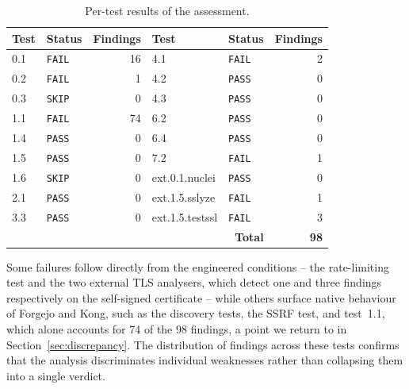 \begin{table}
  \caption{Per-test results of the assessment.}
  \label{tab:results}
  \begin{tabular}{llr @{\hspace{1em}} | @{\hspace{1em}} llr}
    \toprule
    \textbf{Test}                      & \textbf{Status} & \textbf{Findings} & \textbf{Test}   & \textbf{Status} & \textbf{Findings} \\
    \midrule
    0.1                                & \texttt{FAIL}   & 16                & 4.1             & \texttt{FAIL}   & 2                 \\
    0.2                                & \texttt{FAIL}   & 1                 & 4.2             & \texttt{PASS}   & 0                 \\
    0.3                                & \texttt{SKIP}   & 0                 & 4.3             & \texttt{PASS}   & 0                 \\
    1.1                                & \texttt{FAIL}   & 74                & 6.2             & \texttt{PASS}   & 0                 \\
    1.4                                & \texttt{PASS}   & 0                 & 6.4             & \texttt{PASS}   & 0                 \\
    1.5                                & \texttt{PASS}   & 0                 & 7.2             & \texttt{FAIL}   & 1                 \\
    1.6                                & \texttt{SKIP}   & 0                 & ext.0.1.nuclei  & \texttt{PASS}   & 0                 \\
    2.1                                & \texttt{PASS}   & 0                 & ext.1.5.sslyze  & \texttt{FAIL}   & 1                 \\
    3.3                                & \texttt{PASS}   & 0                 & ext.1.5.testssl & \texttt{FAIL}   & 3                 \\
    \midrule
    \multicolumn{5}{r}{\textbf{Total}} & \textbf{98}                                                                                 \\
    \bottomrule
  \end{tabular}
\end{table}

Some failures follow directly from the engineered conditions -- the rate-limiting test and the two external TLS analysers, which detect one and three findings respectively on the self-signed certificate -- while others surface native behaviour of Forgejo and Kong, such as the discovery tests, the SSRF test, and test~1.1, which alone accounts for 74 of the 98 findings, a point we return to in Section~\ref{sec:discrepancy}.
The distribution of findings across these tests confirms that the analysis discriminates individual weaknesses rather than collapsing them into a single verdict.

